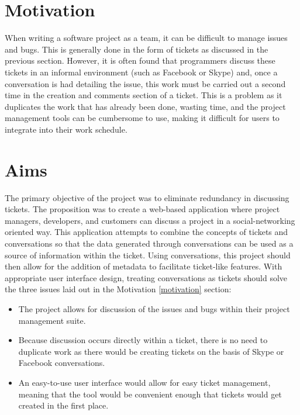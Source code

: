 \documentclass[a4paper]{l3proj}
\begin{document}
\section{Motivation}
\label{motivation}

When writing a software project as a team, it can be difficult to manage issues and bugs. This is generally done in the form of tickets as discussed in the previous section. However, it is often found that programmers discuss these tickets in an informal environment (such as Facebook or Skype) and, once a conversation is had detailing the issue, this work must be carried out a second time in the creation and comments section of a ticket. This is a problem as it duplicates the work that has already been done, wasting time, and the project management tools can be cumbersome to use, making it difficult for users to integrate into their work schedule.

\section{Aims}
\label{aims}

The primary objective of the project was to eliminate redundancy in discussing tickets. The proposition was to create a web-based application where project managers, developers, and customers can discuss a project in a social-networking oriented way. This application attempts to combine the concepts of tickets and conversations so that the data generated through conversations can be used as a source of information within the ticket. Using conversations, this project should then allow for the addition of metadata to facilitate ticket-like features. With appropriate user interface design, treating conversations as tickets should solve the three issues laid out in the Motivation \autoref{motivation} section:
\begin{itemize}
\item The project allows for discussion of the issues and bugs within their project management suite.
\item Because discussion occurs directly within a ticket, there is no need to duplicate work as there would be creating tickets on the basis of Skype or Facebook conversations.
\item An easy-to-use user interface would allow for easy ticket management, meaning that the tool would be convenient enough that tickets would get created in the first place.
\end{itemize}
\end{document}
